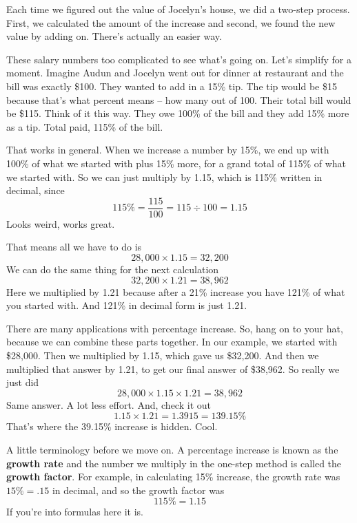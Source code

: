 Each time we figured out the value of Jocelyn's house, we did a two-step process.  First, we calculated the amount of the increase and second, we found the new value by adding on.  There's actually an easier way.

These salary numbers too complicated to see what's going on.  Let's simplify for a moment.  Imagine Audun and Jocelyn went out for dinner at restaurant and the bill was exactly \$100.  They wanted to add in a 15\% tip.  The tip would be \$15 because that's what percent means -- how many out of 100.  Their total bill would be \$115.  Think of it this way.  They owe 100\% of the bill and they add 15\% more as a tip.  Total paid, 115\% of the bill.  

That works in general.  When we increase a number by 15\%, we end up with 100\% of what we started with plus 15\% more, for a grand total of 115\% of what we started with. So we can just multiply by 1.15, which is 115\% written in decimal, since $$115\% = \frac{115}{100} = 115 \div 100 = 1.15$$ Looks weird, works great.    

That means all we have to do is $$28,000 \times 1.15 = 32,200$$  We can do the same thing for the next calculation $$32,200 \times 1.21 = 38,962$$  
Here we multiplied by 1.21 because after a 21\% increase you have 121\% of what you started with.  And 121\% in decimal form is just 1.21. 

There are many applications with percentage increase.  So, hang on to your hat, because we can combine these parts together.  In our example, we started with \$28,000.  Then we multiplied by 1.15, which gave us \$32,200.  And then we multiplied that answer by 1.21, to get our final answer of \$38,962.  So really we just did 
$$28,000 \times 1.15 \times 1.21 = 38,962$$  Same answer.  A lot less effort.
And, check it out $$1.15 \times 1.21 = 1.3915 =139.15\%$$ That's where the 39.15\% increase is hidden. Cool.

A little terminology before we move on.  A percentage increase is known as the \textbf{growth rate} and the number we multiply in the one-step method is called the \textbf{growth factor}.  For example, in calculating 15\% increase, the growth rate was $15\%=.15$ in decimal, and so the growth factor was $$115\%=1.15$$  If you're into formulas here it is. 

 \bigskip
  
